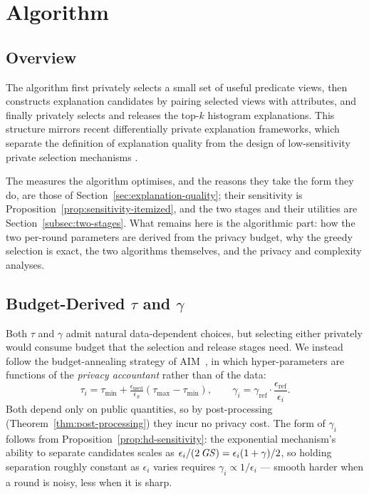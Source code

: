 
\section{Algorithm}\label{sec:solution}

\subsection{Overview}
\label{subsec:algorithm-overview}

The algorithm first privately selects a small set of useful predicate views, then constructs explanation candidates by pairing selected views with attributes, and finally privately selects and releases the top-$k$ histogram explanations.
This structure mirrors recent differentially private explanation frameworks, which separate the definition of explanation quality from the design of low-sensitivity private selection mechanisms \cite{TaoGMR22}.



The measures the algorithm optimises, and the reasons they take the form they do, are those of Section~\ref{sec:explanation-quality}; their sensitivity is Proposition~\ref{prop:sensitivity-itemized}, and the two stages and their utilities are Section~\ref{subsec:two-stages}.
What remains here is the algorithmic part: how the two per-round parameters are derived from the privacy budget, why the greedy selection is exact, the two algorithms themselves, and the privacy and complexity analyses.



\subsection{Budget-Derived $\tau$ and $\gamma$}
\label{subsubsec:adaptive-params}

Both $\tau$ and $\gamma$ admit natural data-dependent choices, but selecting either privately would consume budget that the selection and release stages need.
We instead follow the budget-annealing strategy of AIM~\cite{McKennaMSM22}, in which hyper-parameters are functions of the \emph{privacy accountant} rather than of the data:
\begin{equation}
\tau_i=\tau_{\min}+\tfrac{\epsilon_{\text{used}}}{\epsilon_S}\left(\tau_{\max}-\tau_{\min}\right),
\qquad
\gamma_i=\gamma_{\text{ref}}\cdot\frac{\epsilon_{\text{ref}}}{\epsilon_i}.
\label{eq:adaptive-params}
\end{equation}
Both depend only on public quantities, so by post-processing (Theorem~\ref{thm:post-processing}) they incur no privacy cost.
The form of $\gamma_i$ follows from Proposition~\ref{prop:hd-sensitivity}: the exponential mechanism's ability to separate candidates scales as $\epsilon_i/(2\,\mathit{GS})=\epsilon_i(1+\gamma)/2$, so holding separation roughly constant as $\epsilon_i$ varies requires $\gamma_i\propto 1/\epsilon_i$ --- smooth harder when a round is noisy, less when it is sharp.

